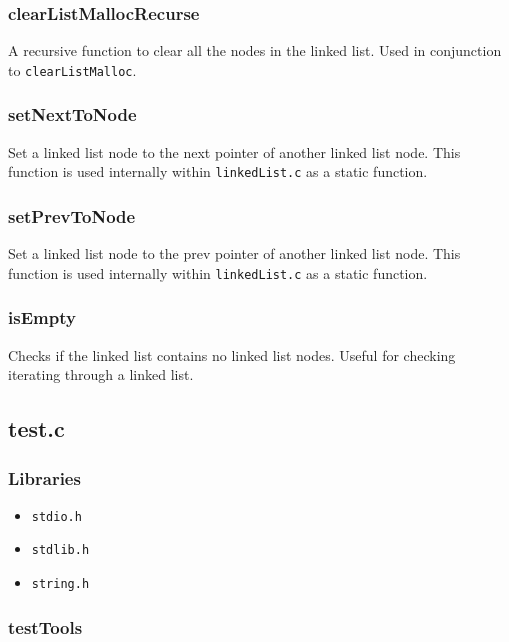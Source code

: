\documentclass[a4paper, 12pt, titlepage]{article}
\newcommand{\code}[1]{\small\texttt{#1}\normalsize}
\begin{document}
\subsubsection{clearListMallocRecurse}

A recursive function to clear all the nodes in the linked list. Used in 
conjunction to \code{clearListMalloc}.

\subsubsection{setNextToNode}

Set a linked list node to the next pointer of another linked list node. This 
function is used internally within \code{linkedList.c} as a static function.

\subsubsection{setPrevToNode}

Set a linked list node to the prev pointer of another linked list node. This 
function is used internally within \code{linkedList.c} as a static function.

\subsubsection{isEmpty}

Checks if the linked list contains no linked list nodes. Useful for checking 
iterating through a linked list.

\pagebreak
\subsection{test.c}
\subsubsection{Libraries}

\begin{itemize}[label={--}, noitemsep]
    \item \code{stdio.h}
    \item \code{stdlib.h}
    \item \code{string.h}
\end{itemize}

\subsubsection{testTools}
\end{document}
